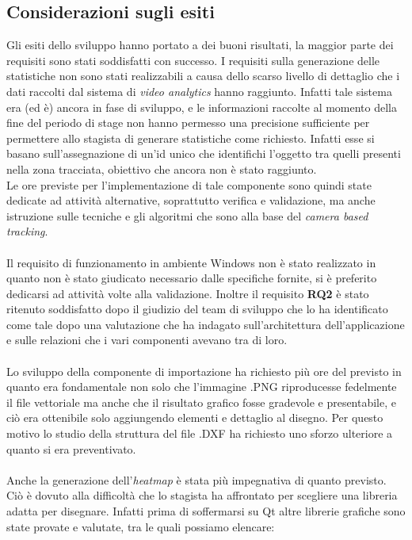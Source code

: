 \documentclass[a4paper,13pt,twoside]{article}
\begin{document}
\subsection{Considerazioni sugli esiti}
Gli esiti dello sviluppo hanno portato a dei buoni risultati, la maggior parte dei requisiti sono stati soddisfatti con successo. I requisiti sulla generazione delle statistiche non sono stati realizzabili a causa dello scarso livello di dettaglio che i dati raccolti dal sistema di \textit{video analytics} hanno raggiunto. Infatti tale sistema era (ed è) ancora in fase di sviluppo, e le informazioni raccolte al momento della fine del periodo di stage non hanno permesso una precisione sufficiente per permettere allo stagista di generare statistiche come richiesto. Infatti esse si basano sull'assegnazione di un'id unico che identifichi l'oggetto tra quelli presenti nella zona tracciata, obiettivo che ancora non è stato raggiunto. \\ 
Le ore previste per l'implementazione di tale componente sono quindi state dedicate ad attività alternative, soprattutto verifica e validazione, ma anche istruzione sulle tecniche e gli algoritmi che sono alla base del \textit{camera based tracking}. \\ \\
Il requisito di funzionamento in ambiente Windows non è stato realizzato in quanto non è stato giudicato necessario dalle specifiche fornite, si è preferito dedicarsi ad attività volte alla validazione. Inoltre il requisito \textbf{RQ2} è stato ritenuto soddisfatto dopo il giudizio del team di sviluppo che lo ha identificato come tale dopo una valutazione che ha indagato sull'architettura dell'applicazione e sulle relazioni che i vari componenti avevano tra di loro. \\ \\
Lo sviluppo della componente di importazione ha richiesto più ore del previsto in quanto era fondamentale non solo che l'immagine .PNG riproducesse fedelmente il file vettoriale ma anche che il risultato grafico fosse gradevole e presentabile, e ciò era ottenibile solo aggiungendo elementi e dettaglio al disegno. Per questo motivo lo studio della struttura del file .DXF ha richiesto uno sforzo ulteriore a quanto si era preventivato. \\ \\ 
Anche la generazione dell'\textit{heatmap} è stata più impegnativa di quanto previsto. Ciò è dovuto alla difficoltà che lo stagista ha affrontato per scegliere una libreria adatta per disegnare. Infatti prima di soffermarsi su Qt altre librerie grafiche sono state provate e valutate, tra le quali possiamo elencare:
\end{document}
